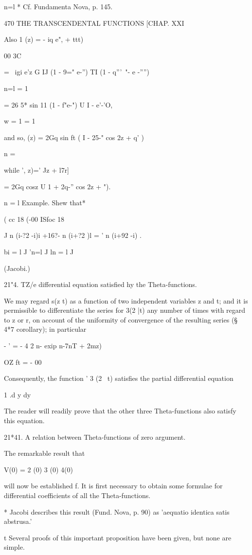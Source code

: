 n=l * Cf. Fundamenta Nova, p. 145.

470 THE TRANSCENDENTAL FUNCTIONS [CHAP. XXI

Also 1 (z) = - iq e", + ttt)

00 3C

= \ igi e'z G IJ (1 - 9=" e-'') TI (1 - q'''~"- e -'''')

n=l = 1

= 26 5* sin 11 (1 - f"e-") U I - e'-'O,

w = 1 = 1

and so, (z) = 2Gq sin ft ( I - 25-" cos 2z + q' )

n = \

while ', z)=' Jz + l7r]

= 2Gq cosz U 1 + 2q-'' cos 2z + ").

n = l Example. Shew that*

( cc 18 (-00 ISfoc 18

J n (i-?2 -i)i +16?- n (i+?2 )l = ' n (i+92 -i) .

bi = l J 'n=l J ln = l J

(Jacobi.)

21"4. TZ/e differential equation satisfied hy the Theta-functions.

We may regard s(z t) as a function of two independent variables z and
t; and it is permissible to differentiate the series for 3(2 |t) any
number of times with regard to z or r, on account of the uniformity of
convergence of the resulting series (§ 4*7 corollary); in particular

- ' = - 4 2 n- exip n-7nT + 2mz)

OZ ft = - 00

Consequently, the function ' 3 (2 \ t) satisfies the partial
differential equation

1 .d y dy

The reader will readily prove that the other three Theta-functions
also satisfy this equation.

21*41. A relation between Theta-functions of zero argument.

The remarkable result that

V(0) = 2 (0) 3 (0) 4(0)

will now be established f. It is first necessary to obtain some
formulae for differential coefficients of all the Theta-functions.

* Jacobi describes this result (Fund. Nova, p. 90) as 'aequatio
identica satis abstrusa.'

t Several proofs of this important proposition have been given, but
none are simple.

